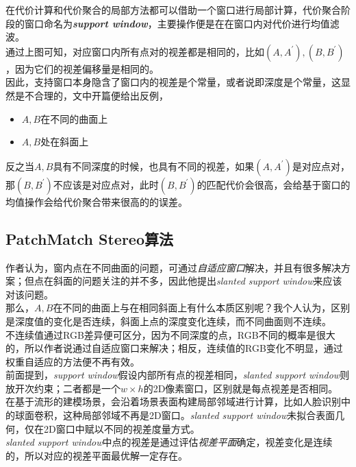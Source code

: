 在代价计算和代价聚合的局部方法都可以借助一个窗口进行局部计算，代价聚合阶段的窗口命名为\textit{\textbf{support window}}，主要操作便是在在窗口内对代价进行均值滤波。\\

通过上图可知，对应窗口内所有点对的视差都是相同的，比如$(A,A^\prime),(B,B^\prime)$，因为它们的视差偏移量是相同的。\\

因此，支持窗口本身隐含了窗口内的视差是个常量，或者说即深度是个常量，这显然是不合理的，文中开篇便给出反例，
\begin{itemize}
	\item $A,B$在不同的曲面上
	\item $A,B$处在斜面上
\end{itemize}

反之当$A,B$具有不同深度的时候，也具有不同的视差，如果$(A,A^\prime)$是对应点对，那$(B,B^\prime)$不应该是对应点对，此时$(B,B^\prime)$的匹配代价会很高，会给基于窗口的均值操作会给代价聚合带来很高的的误差。

\subsection{PatchMatch Stereo算法}

作者认为，窗内点在不同曲面的问题，可通过\textit{自适应窗口}解决，并且有很多解决方案；但点在斜面的问题关注的并不多，因此他提出\textit{slanted support window}来应该对该问题。\\

那么，$A,B$在不同的曲面上与在相同斜面上有什么本质区别呢？我个人认为，区别是深度值的变化是否连续，斜面上点的深度变化连续，而不同曲面则不连续。\\

不连续值通过RGB差异便可区分，因为不同深度的点，RGB不同的概率是很大的，所以作者说通过自适应窗口来解决；相反，连续值的RGB变化不明显，通过权重自适应的方法便不再有效。\\

前面提到，\textit{support window}假设内部所有点的视差相同，\textit{slanted support window}则放开次约束；二者都是一个$w\times h$的2D像素窗口，区别就是每点视差是否相同。\\

在基于流形的建模场景，会沿着场景表面构建局部邻域进行计算，比如人脸识别中的球面卷积，这种局部邻域不再是2D窗口。\textit{slanted support window}未拟合表面几何，仅在2D窗口中赋以不同的视差度量方式。\\

\textit{slanted support window}中点的视差是通过评估\textit{视差平面}确定，视差变化是连续的，所以对应的视差平面最优解一定存在。

